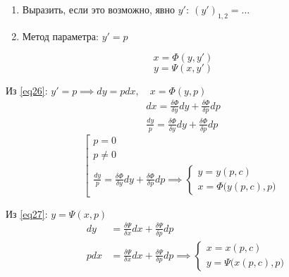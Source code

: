 \begin{note}\leavevmode
    \begin{enumerate}
        \item Выразить, если это возможно, явно $y': \ (y')_{1,2} = \ldots$
        \item Метод параметра: $y'=p$
    \end{enumerate}
    \begin{equation}\label{eq26}
        x = \Phi (y,y')
    \end{equation}
    \begin{equation}
        y = \Psi (x,y')\label{eq27}
    \end{equation}

    Из \ref{eq26}: $y' = p \implies dy = pdx, \quad x = \Phi(y,p)$
    \begin{eqnarray*}
        dx = \frac{\delta \Phi}{\delta y}dy + \frac{\delta \Phi}{\delta p}dp \\
        \frac{dy}{p} = \frac{\delta \Phi}{\delta y}dy + \frac{\delta \Phi}{\delta p}dp
    \end{eqnarray*}
    \[
        \left[\begin{array}{l}
            p = 0   \\
            p \ne 0 \\
            \frac{dy}{p} = \frac{\delta \Phi}{\delta y}dy + \frac{\delta \Phi}{\delta p}dp \implies \left\{
            \begin{array}{l}
                y = y(p,c) \\
                x = \Phi \big(y(p,c),p\big)
            \end{array}\right.
        \end{array}\right.
    \]

    Из \ref{eq27}: $y = \Psi(x,p)$
    \begin{eqnarray*}
        & dy & = \frac{\delta \Psi}{\delta x}dx + \frac{\delta \Psi}{\delta p}dp \\
        & pdx & = \frac{\delta \Psi}{\delta x}dx + \frac{\delta \Psi}{\delta p}dp \implies \left\{\begin{array}{l}
            x = x(p,c) \\
            y = \Psi\big(x(p,c),p\big)
        \end{array}\right.
    \end{eqnarray*}
\end{note}

